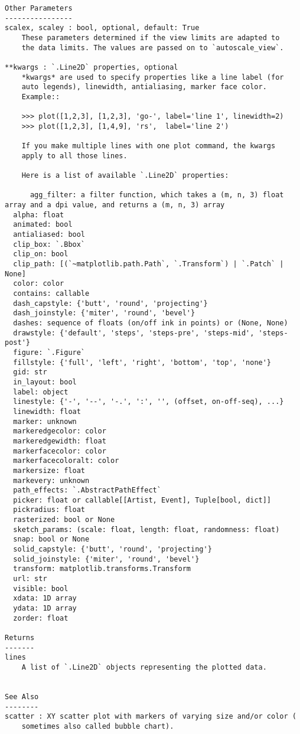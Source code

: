 \documentclass[11pt]{article}
\begin{document}
\begin{verbatim}
Other Parameters
----------------
scalex, scaley : bool, optional, default: True
    These parameters determined if the view limits are adapted to
    the data limits. The values are passed on to `autoscale_view`.

**kwargs : `.Line2D` properties, optional
    *kwargs* are used to specify properties like a line label (for
    auto legends), linewidth, antialiasing, marker face color.
    Example::

    >>> plot([1,2,3], [1,2,3], 'go-', label='line 1', linewidth=2)
    >>> plot([1,2,3], [1,4,9], 'rs',  label='line 2')

    If you make multiple lines with one plot command, the kwargs
    apply to all those lines.

    Here is a list of available `.Line2D` properties:

      agg_filter: a filter function, which takes a (m, n, 3) float array and a dpi value, and returns a (m, n, 3) array 
  alpha: float
  animated: bool
  antialiased: bool
  clip_box: `.Bbox`
  clip_on: bool
  clip_path: [(`~matplotlib.path.Path`, `.Transform`) | `.Patch` | None] 
  color: color
  contains: callable
  dash_capstyle: {'butt', 'round', 'projecting'}
  dash_joinstyle: {'miter', 'round', 'bevel'}
  dashes: sequence of floats (on/off ink in points) or (None, None)
  drawstyle: {'default', 'steps', 'steps-pre', 'steps-mid', 'steps-post'}
  figure: `.Figure`
  fillstyle: {'full', 'left', 'right', 'bottom', 'top', 'none'}
  gid: str
  in_layout: bool
  label: object
  linestyle: {'-', '--', '-.', ':', '', (offset, on-off-seq), ...}
  linewidth: float
  marker: unknown
  markeredgecolor: color
  markeredgewidth: float
  markerfacecolor: color
  markerfacecoloralt: color
  markersize: float
  markevery: unknown
  path_effects: `.AbstractPathEffect`
  picker: float or callable[[Artist, Event], Tuple[bool, dict]]
  pickradius: float
  rasterized: bool or None
  sketch_params: (scale: float, length: float, randomness: float) 
  snap: bool or None
  solid_capstyle: {'butt', 'round', 'projecting'}
  solid_joinstyle: {'miter', 'round', 'bevel'}
  transform: matplotlib.transforms.Transform
  url: str
  visible: bool
  xdata: 1D array
  ydata: 1D array
  zorder: float

Returns
-------
lines
    A list of `.Line2D` objects representing the plotted data.


See Also
--------
scatter : XY scatter plot with markers of varying size and/or color (
    sometimes also called bubble chart).



\end{verbatim}
\end{document}
